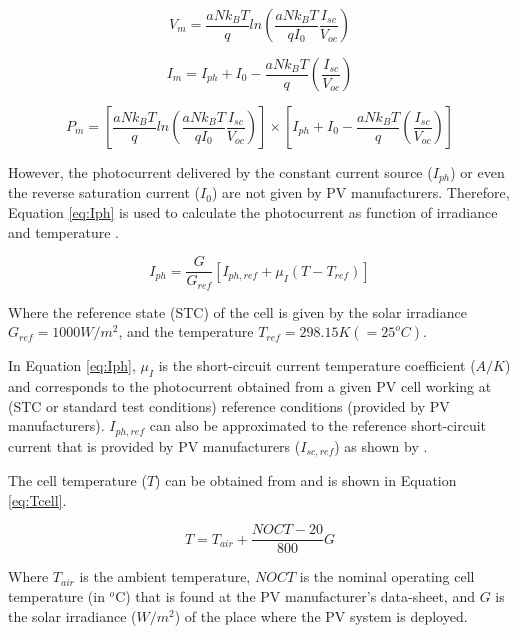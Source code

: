 \begin{equation}
\label{eq:Vmfinal}
V_{m}=\dfrac{aNk_{B}T}{q} ln \left( \dfrac{aNk_{B}T}{qI_{0}} \dfrac{I_{sc}}{V_{oc}}  \right) 
\end{equation}

\begin{equation}
\label{eq:Imfinal}
I_{m} = I_{ph} + I_{0} - \dfrac{aNk_{B}T}{q} \left( \dfrac{I_{sc}}{V_{oc}} \right)  
\end{equation}

\begin{equation}
\label{eq:Pm}
P_{m} = \left[ \dfrac{aNk_{B}T}{q} ln \left( \dfrac{aNk_{B}T}{qI_{0}} \dfrac{I_{sc}}{V_{oc}}  \right) \right] \times \left[ I_{ph} + I_{0} - \dfrac{aNk_{B}T}{q} \left( \dfrac{I_{sc}}{V_{oc}} \right)  \right] 
\end{equation}


However, the photocurrent delivered by the constant current source ($ I_{ph} $) or even the reverse saturation current ($ I_{0} $) are not given by PV manufacturers. Therefore, Equation \ref{eq:Iph} is used to calculate the photocurrent as function of irradiance and temperature \cite{Villalva}.

\begin{equation}
\label{eq:Iph}
I_{ph}=\dfrac{G}{G_{ref}} \left[ I_{ph,ref} + \mu_{I} \left( T-T_{ref} \right)    \right] 
\end{equation}

Where the reference state (STC) of the cell is given by the solar irradiance $ G_{ref}=1000 W/m^{2} $, and the temperature $ T_{ref}=298.15 K (=25^{o}C) $.

In Equation \ref{eq:Iph}, $ \mu_{I} $ is the short-circuit current temperature coefficient ($A/K$) and corresponds to the photocurrent obtained from a given PV cell working at (STC or standard test conditions) reference conditions (provided by PV manufacturers). $ I_{ph,ref} $ can also be approximated to the reference short-circuit current that is provided by PV manufacturers ($ I_{sc,ref} $) as shown by \cite{Jakhrani}.

The cell temperature ($ T $) can be obtained from \cite{Ross} and is shown in Equation \ref{eq:Tcell}.

\begin{equation}
\label{eq:Tcell}
T = T_{air} + \dfrac{NOCT-20}{800}G
\end{equation}

Where $ T_{air} $ is the ambient temperature, $NOCT$ is the nominal operating cell temperature (in $^{o}$C) that is found at the PV manufacturer's data-sheet, and $G$ is the solar irradiance ($ W/m^{2} $) of the place where the PV system is deployed.

